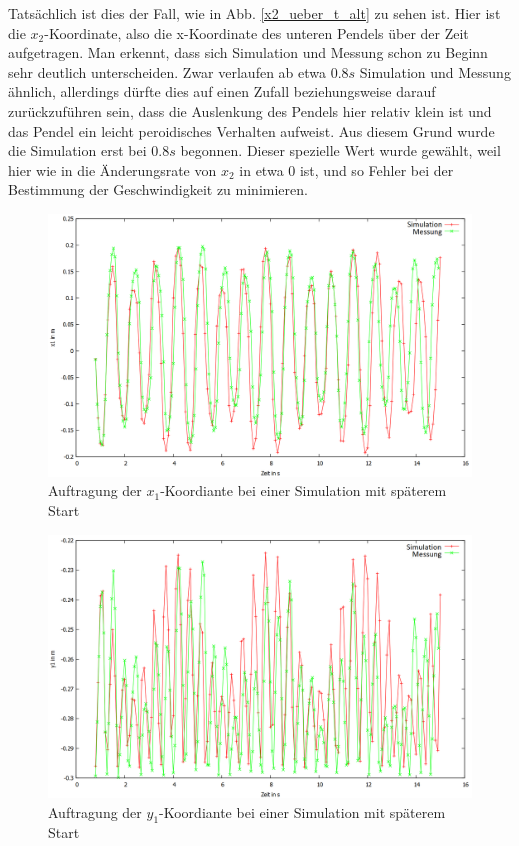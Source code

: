 Tatsächlich ist dies der Fall, wie in Abb. \ref{x2_ueber_t_alt} zu sehen ist. Hier ist die $x_2$-Koordinate, also die x-Koordinate des unteren Pendels über der Zeit aufgetragen. Man erkennt, dass sich Simulation und Messung schon zu Beginn sehr deutlich unterscheiden. Zwar verlaufen ab etwa $ 0.8 s $ Simulation und Messung ähnlich, allerdings dürfte dies auf einen Zufall beziehungsweise darauf zurückzuführen sein, dass die Auslenkung des Pendels hier relativ klein ist und das Pendel ein leicht peroidisches Verhalten aufweist. 
Aus diesem Grund wurde die Simulation erst bei $ 0.8 s $ begonnen. Dieser spezielle Wert wurde gewählt, weil hier wie in  die Änderungsrate von $x_2$ in etwa 0 ist, und so Fehler bei der Bestimmung der Geschwindigkeit zu minimieren. 

\begin{figure}
        \includegraphics[width=.9\textwidth]{images/x1_ueber_t_neu.png}
\caption{Auftragung der $x_1$-Koordiante bei einer Simulation mit späterem Start}
\label{x1_ueber_t}
\end{figure}

\begin{figure}
        \includegraphics[width=.9\textwidth]{images/y1_ueber_t_neu.png}
\caption{Auftragung der $y_1$-Koordiante bei einer Simulation mit späterem Start}
\label{y1_ueber_t}
\end{figure}


